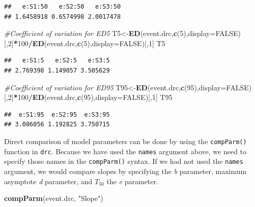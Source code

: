 \documentclass[letterpaper,]{book}
\newenvironment{Shaded}{\begin{snugshade}}{\end{snugshade}}
\newcommand{\CommentTok}[1]{\textcolor[rgb]{0.56,0.35,0.01}{\textit{#1}}}
\newcommand{\DataTypeTok}[1]{\textcolor[rgb]{0.13,0.29,0.53}{#1}}
\newcommand{\DecValTok}[1]{\textcolor[rgb]{0.00,0.00,0.81}{#1}}
\newcommand{\KeywordTok}[1]{\textcolor[rgb]{0.13,0.29,0.53}{\textbf{#1}}}
\newcommand{\NormalTok}[1]{#1}
\newcommand{\OperatorTok}[1]{\textcolor[rgb]{0.81,0.36,0.00}{\textbf{#1}}}
\newcommand{\OtherTok}[1]{\textcolor[rgb]{0.56,0.35,0.01}{#1}}
\newcommand{\StringTok}[1]{\textcolor[rgb]{0.31,0.60,0.02}{#1}}
\begin{document}
\begin{verbatim}
##   e:S1:50   e:S2:50   e:S3:50 
## 1.6458918 0.6574998 2.0017478
\end{verbatim}

\begin{Shaded}
\begin{Highlighting}[]
\CommentTok{#Coefficient of variation for ED5}
\NormalTok{T5<-}\KeywordTok{ED}\NormalTok{(event.drc,}\KeywordTok{c}\NormalTok{(}\DecValTok{5}\NormalTok{),}\DataTypeTok{display=}\OtherTok{FALSE}\NormalTok{)[,}\DecValTok{2}\NormalTok{]}\OperatorTok{*}\DecValTok{100}\OperatorTok{/}\KeywordTok{ED}\NormalTok{(event.drc,}\KeywordTok{c}\NormalTok{(}\DecValTok{5}\NormalTok{),}\DataTypeTok{display=}\OtherTok{FALSE}\NormalTok{)[,}\DecValTok{1}\NormalTok{]}
\NormalTok{T5}
\end{Highlighting}
\end{Shaded}

\begin{verbatim}
##   e:S1:5   e:S2:5   e:S3:5 
## 2.769398 1.149057 3.505629
\end{verbatim}

\begin{Shaded}
\begin{Highlighting}[]
\CommentTok{#Coefficient of variation for ED95}
\NormalTok{T95<-}\KeywordTok{ED}\NormalTok{(event.drc,}\KeywordTok{c}\NormalTok{(}\DecValTok{95}\NormalTok{),}\DataTypeTok{display=}\OtherTok{FALSE}\NormalTok{)[,}\DecValTok{2}\NormalTok{]}\OperatorTok{*}\DecValTok{100}\OperatorTok{/}\KeywordTok{ED}\NormalTok{(event.drc,}\KeywordTok{c}\NormalTok{(}\DecValTok{95}\NormalTok{),}\DataTypeTok{display=}\OtherTok{FALSE}\NormalTok{)[,}\DecValTok{1}\NormalTok{]}
\NormalTok{T95}
\end{Highlighting}
\end{Shaded}

\begin{verbatim}
##  e:S1:95  e:S2:95  e:S3:95 
## 3.086056 1.192825 3.750715
\end{verbatim}

Direct comparison of model parameters can be done by using the \texttt{compParm()} function in \texttt{drc}. Because we have used the \texttt{names} argument above, we need to specify those names in the \texttt{compParm()} syntax. If we had not used the \texttt{names} argument, we would compare slopes by specifying the \emph{b} parameter, maximum asymptote \emph{d} parameter, and \(T_{50}\) the \emph{e} parameter.

\begin{Shaded}
\begin{Highlighting}[]
\KeywordTok{compParm}\NormalTok{(event.drc, }\StringTok{"Slope"}\NormalTok{)}
\end{Highlighting}
\end{Shaded}
\end{document}
